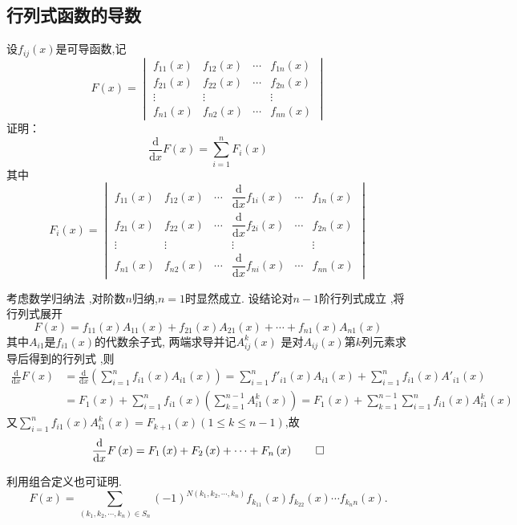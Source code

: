 \subsection{行列式函数的导数}
\begin{brown}
    \begin{problem}
设$f_{ij}\left(x\right)$是可导函数,记
\[
F\left(x\right)=
\begin{vmatrix}
    f_{11}\left(x\right)&f_{12}\left(x\right)&\cdots&f_{1n}\left(x\right)\\
    f_{21}\left(x\right)&f_{22}\left(x\right)&\cdots&f_{2n}\left(x\right)\\
    \vdots&\vdots&&\vdots\\
    f_{n1}\left(x\right)&f_{n2}\left(x\right)&\cdots&f_{nn}\left(x\right)
\end{vmatrix}
\]
证明：
\[
\frac{\mathrm{d}}{\mathrm{d}x}F\left(x\right)
=
\sum_{i=1}^{n}F_i\left(x\right)
\]
其中
\[
F_i\left(x\right)
=
\begin{vmatrix}
    f_{11}\left(x\right)&f_{12}\left(x\right)&\cdots&\dfrac{\mathrm{d}}{\mathrm{d}x}f_{1i}\left(x\right)&\cdots&f_{1n}\left(x\right)\\[1em]
    f_{21}\left(x\right)&f_{22}\left(x\right)&\cdots&\dfrac{\mathrm{d}}{\mathrm{d}x}f_{2i}\left(x\right)&\cdots&f_{2n}\left(x\right)\\
    \vdots&\vdots&&\vdots&&\vdots\\
    f_{n1}\left(x\right)&f_{n2}\left(x\right)&\cdots&\dfrac{\mathrm{d}}{\mathrm{d}x}f_{ni}\left(x\right)&\cdots&f_{nn}\left(x\right)
\end{vmatrix}
\]
\end{problem}
\begin{Proof}
考虑数学归纳法
,对阶数$n$归纳,$n=1$时显然成立.
设结论对$n-1$阶行列式成立
,将行列式展开
\[
F\left(x\right)
=
f_{11}\left(x\right)
A_{11}\left(x\right)
+f_{21}\left(x\right)A_{21}\left(x\right)+
\cdots+f_{n1}\left(x\right)A_{n1}\left(x\right)
\]
其中$A_{i1}$是$f_{i1}\left(x\right)$的代数余子式,
两端求导并记$A_{ij}^k\left(x\right)$
是对$A_{ij}\left(x\right)$第$k$列元素求导后得到的行列式
,则
\begin{align*}
    \frac{\mathrm{d}}{\mathrm{d}x}F\left(x\right)
    &=\frac{\mathrm{d}}{\mathrm{d}x}\left(
        \sum_{i=1}^{n}f_{i1}\left(x\right)A_{i1}\left(x\right)
    \right)
    =\sum_{i=1}^{n}f'_{i1}\left(x\right)A_{i1}\left(x\right)
    +\sum_{i=1}^{n}f_{i1}\left(x\right)A'_{i1}\left(x\right)\\
    &=F_1\left(x\right)+\sum_{i=1}^{n}f_{i1}\left(x\right)
    \left(\sum_{k=1}^{n-1}A^k_{i1}\left(x
    \right)\right)=F_1\left(x\right)+
    \sum_{k=1}^{n-1}\sum_{i=1}^{n}
    f_{i1}\left(x\right)A^k_{i1}\left(x\right)
\end{align*}
又$\displaystyle
\sum_{i=1}^{n}f_{i1}\left(x\right)A_{i1}^k\left(x
\right)=F_{k+1}\left(x\right)\left(
    1\leqslant k\leqslant n-1
\right)$,故
\[
\frac{\mathrm{d}}{\mathrm{d}x}F\left(x\right)
=
F_{1}\left(x\right)+F_2\left(x
\right)+\cdots+F_n\left(x\right)
\qedhere
\]
\end{Proof}
利用组合定义也可证明.
\[
F\left(x\right)=
\sum_{\left(k_1,k_2,\cdots,k_n\right)\in
S_n}\left(-1\right)^{N\left(k_1,k_2,\cdots,k_n\right)}
f_{k_11}\left(x\right)f_{k_22}\left(x\right)\cdots
f_{k_nn}\left(x\right).
\]
\end{brown}
